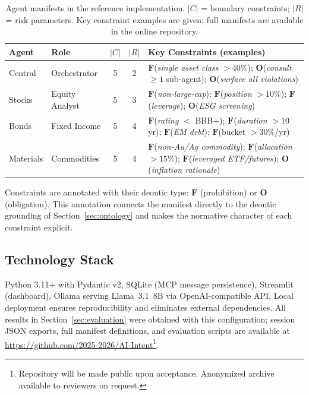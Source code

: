 \documentclass[runningheads]{llncs}
\begin{document}
\begin{table}[t]
\centering
\caption{Agent manifests in the reference implementation. $|C|$ =
boundary constraints; $|R|$ = risk parameters. Key constraint examples
are given; full manifests are available in the online repository.}
\label{tab:manifests}
\begin{tabular}{@{}llccp{4.5cm}@{}}
\toprule
\textbf{Agent} & \textbf{Role} & $|C|$ & $|R|$ &
\textbf{Key Constraints (examples)} \\
\midrule
Central & Orchestrator & 5 & 2 & $\mathbf{F}$(\textit{single asset class}
    $> 40\%$); $\mathbf{O}$(\textit{consult} $\geq 1$ sub-agent);
    $\mathbf{O}$(\textit{surface all violations}) \\
Stocks & Equity Analyst & 5 & 3 & $\mathbf{F}$(\textit{non-large-cap});
    $\mathbf{F}$(\textit{position} $> 10\%$);
    $\mathbf{F}$(\textit{leverage}); $\mathbf{O}$(\textit{ESG screening})
    \\
Bonds & Fixed Income & 5 & 4 & $\mathbf{F}$(\textit{rating} $<$ BBB+);
    $\mathbf{F}$(\textit{duration} $> 10$yr);
    $\mathbf{F}$(\textit{EM debt}); $\mathbf{F}$(bucket $> 30\%$/yr) \\
Materials & Commodities & 5 & 4 &
    $\mathbf{F}$(\textit{non-Au/Ag commodity});
    $\mathbf{F}$(\textit{allocation} $> 15\%$);
    $\mathbf{F}$(\textit{leveraged ETF/futures});
    $\mathbf{O}$(\textit{inflation rationale}) \\
\bottomrule
\end{tabular}
\end{table}

Constraints are annotated with their deontic type: $\mathbf{F}$
(prohibition) or $\mathbf{O}$ (obligation). This annotation connects the
manifest directly to the deontic grounding of Section~\ref{sec:ontology}
and makes the normative character of each constraint explicit.

\subsection{Technology Stack}

Python 3.11+ with Pydantic v2, SQLite (MCP message persistence),
Streamlit (dashboard), Ollama serving Llama~3.1~8B via OpenAI-compatible
API. Local deployment ensures reproducibility and eliminates external
dependencies. All results in Section~\ref{sec:evaluation} were obtained
with this configuration; session JSON exports, full manifest definitions,
and evaluation scripts are available at
\url{https://github.com/2025-2026/AI-Intent}\footnote{Repository will be
made public upon acceptance. Anonymized archive available to reviewers on
request.}.
\end{document}
